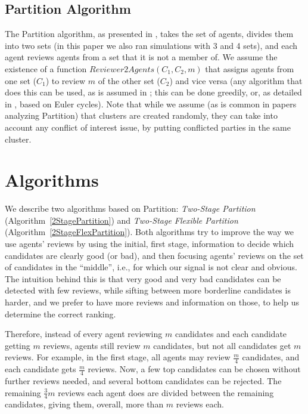 \documentclass[letterpaper]{article}
\begin{document}
\subsection{Partition Algorithm}
The Partition algorithm, as presented in \citet{AFPT11}, takes the set of agents, divides them into two sets (in this paper we also ran simulations with 3 and 4 sets), and each agent reviews agents from a set that it is not a member of. %
We assume the existence of a function $Reviewer2Agents(C_{1},C_{2},m)$ that assigns agents from one set ($C_{1}$) to review $m$ of the other set ($C_{2}$) and vice versa (any algorithm that does this can be used, as is assumed in \citet{ALMRW16,ALMRW19}; this can be done greedily, or, as detailed in \citet{LMTZ23}, based on Euler cycles). Note that while we assume (as is common in papers analyzing Partition) that clusters are created randomly, they can take into account any conflict of interest issue, by putting conflicted parties in the same cluster.




\section{Algorithms}\label{algos}
We describe two algorithms based on Partition: \emph{Two-Stage Partition} (Algorithm~\ref{2StagePartition}) and \emph{Two-Stage Flexible Partition} (Algorithm~\ref{2StageFlexPartition}). Both algorithms try to improve the way we use agents' reviews by using the initial, first stage, information to decide which candidates are clearly good (or bad), and then focusing agents' reviews on the set of candidates in the ``middle'', i.e., for which our signal is not clear and obvious. The intuition behind this is that very good and very bad candidates can be detected with few reviews, while sifting between more borderline candidates is harder, and we prefer to have more reviews and information on those, to help us determine the correct ranking.

Therefore, instead of every agent reviewing $m$ candidates and each candidate getting $m$ reviews, agents still review $m$ candidates, but not all candidates get $m$ reviews. For example, in the first stage, all agents may review $\frac{m}{4}$ candidates, and each candidate gets $\frac{m}{4}$ reviews. Now, a few top candidates can be chosen without further reviews needed, and several bottom candidates can be rejected. The remaining $\frac{3}{4}m$ reviews each agent does are divided between the remaining candidates, giving them, overall, more than $m$ reviews each.
\end{document}
